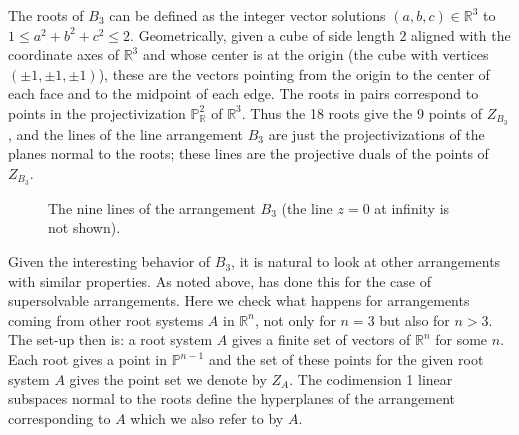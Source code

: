\documentclass[12pt]{amsart}
\numberwithin{equation}{section}
\theoremstyle{definition}
\newcommand{\RR}{ \ensuremath{\mathbb{R}}}
\newcommand{\PP}{ \ensuremath{\mathbb{P}}}
\begin{document}
The roots of $B_3$ can be defined as the integer vector solutions $(a,b,c)\in\RR^3$
to $1\leq a^2+b^2+c^2\leq2$.
Geometrically, given a cube of side length $2$ aligned with the coordinate axes of
$\RR^3$ and whose center is at the origin
(the cube with vertices $(\pm 1, \pm 1, \pm 1)$), 
these are the vectors pointing from the origin
to the center of each face and to the midpoint of each edge. The roots in pairs correspond to points
in the projectivization $\PP^2_\RR$ of $\RR^3$. Thus the 18 roots give the 9 points
of $Z_{B_3}$, and the lines of the line arrangement $B_3$ are just the projectivizations
of the planes normal to the roots; these lines are the projective duals of the points of $Z_{B_3}$.

\begin{figure}
\begin{center}
\caption{The nine lines of the arrangement $B_3$ (the line $z=0$ at infinity is not shown).}
\label{B3Fig}
\end{center}
\end{figure}

Given the interesting behavior of $B_3$, it is natural to look at other arrangements with similar properties.
As noted above, \cite{DMO} has done this for the case of supersolvable arrangements.
Here we check what happens for arrangements coming from other root systems
$A$ in $\RR^n$, not only for $n=3$ but also for $n>3$.
The set-up then is:
a root system $A$ gives a finite set of vectors of $\RR^n$ for some $n$.
Each root gives a point in $\PP^{n-1}$ and the set of these points for the given root system $A$
gives the point set we denote by $Z_A$. The codimension 1 linear subspaces normal to the
roots define the hyperplanes of the arrangement corresponding to $A$ which we also refer to by $A$.
\end{document}
